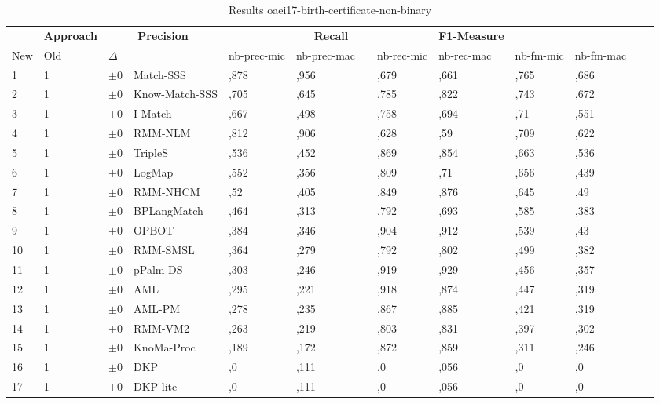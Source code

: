 \begin{table}[htb]
\setlength{\tabcolsep}{0.5em}
\centering
\scriptsize
\begin{tabular}[tb]{lllp{2.3cm}llllllllll}
\noalign{\smallskip}\hline\noalign{\smallskip}
\multicolumn{3}{c}{\textbf{Rank}}& \textbf{Approach}  & \multicolumn{2}{c}{\textbf{Precision}}  & \hspace*{1mm}  & \multicolumn{2}{c}{\textbf{Recall}}  & \hspace*{1mm}  & \multicolumn{2}{c}{\textbf{F1-Measure}}  & \hspace*{1mm} \\
New & Old & $\Delta$ & &nb-prec-mic & nb-prec-mac && nb-rec-mic & nb-rec-mac && nb-fm-mic & nb-fm-mac\\
\noalign{\smallskip}\hline\noalign{\smallskip}
1 & 1 		& $\pm$0 &Match-SSS    	&	,878 & ,956 & & ,679 & ,661 & & ,765 & ,686\\
2 & 1 		& $\pm$0 &Know-Match-SSS    	&	,705 & ,645 & & ,785 & ,822 & & ,743 & ,672\\
3 & 1 		& $\pm$0 &I-Match    	&	,667 & ,498 & & ,758 & ,694 & & ,71 & ,551\\
4 & 1 		& $\pm$0 &RMM-NLM    	&	,812 & ,906 & & ,628 & ,59 & & ,709 & ,622\\
5 & 1 		& $\pm$0 &TripleS    	&	,536 & ,452 & & ,869 & ,854 & & ,663 & ,536\\
6 & 1 		& $\pm$0 &LogMap    	&	,552 & ,356 & & ,809 & ,71 & & ,656 & ,439\\
7 & 1 		& $\pm$0 &RMM-NHCM    	&	,52 & ,405 & & ,849 & ,876 & & ,645 & ,49\\
8 & 1 		& $\pm$0 &BPLangMatch    	&	,464 & ,313 & & ,792 & ,693 & & ,585 & ,383\\
9 & 1 		& $\pm$0 &OPBOT    	&	,384 & ,346 & & ,904 & ,912 & & ,539 & ,43\\
10 & 1 		& $\pm$0 &RMM-SMSL    	&	,364 & ,279 & & ,792 & ,802 & & ,499 & ,382\\
11 & 1 		& $\pm$0 &pPalm-DS    	&	,303 & ,246 & & ,919 & ,929 & & ,456 & ,357\\
12 & 1 		& $\pm$0 &AML    	&	,295 & ,221 & & ,918 & ,874 & & ,447 & ,319\\
13 & 1 		& $\pm$0 &AML-PM    	&	,278 & ,235 & & ,867 & ,885 & & ,421 & ,319\\
14 & 1 		& $\pm$0 &RMM-VM2    	&	,263 & ,219 & & ,803 & ,831 & & ,397 & ,302\\
15 & 1 		& $\pm$0 &KnoMa-Proc    	&	,189 & ,172 & & ,872 & ,859 & & ,311 & ,246\\
16 & 1 		& $\pm$0 &DKP    	&	,0 & ,111 & & ,0 & ,056 & & ,0 & ,0\\
17 & 1 		& $\pm$0 &DKP-lite    	&	,0 & ,111 & & ,0 & ,056 & & ,0 & ,0\\
\end{tabular}
\caption{Results oaei17-birth-certificate-non-binary}
\label{tbl:results}
\end{table}